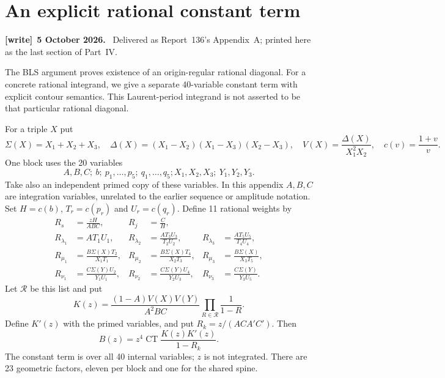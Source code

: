\documentclass[11pt,letterpaper]{article}
\theoremstyle{remark}\newtheorem{remark}[theorem]{Remark}
\numberwithin{equation}{section}
\newenvironment{writenote}[1][]{\par\smallskip\begingroup\small
 \noindent\textbf{[write]}\if\relax\detokenize{#1}\relax\else~\textbf{#1.}\fi\ }%
 {\par\endgroup\smallskip}
\begin{document}
\section{An explicit rational constant term}\label{upo:1243:app:CT}
\begin{writenote}[5 October 2026]
Delivered as Report~136's Appendix~A; printed here as the last section of Part~IV.
\end{writenote}
The BLS argument proves existence of an origin-regular rational diagonal.
For a concrete rational integrand, we give a separate 40-variable constant
term with explicit contour semantics. This Laurent-period integrand is
not asserted to be that particular rational diagonal.

For a triple $X$ put
\[
 \Sigma(X)=X_1+X_2+X_3,\quad
 \Delta(X)=(X_1-X_2)(X_1-X_3)(X_2-X_3),\quad
 V(X)=\frac{\Delta(X)}{X_1^2X_2},\quad c(v)=\frac{1+v}{v}.
\]
One block uses the 20 variables
\[
 A,B,C;\ b;\ p_1,\ldots,p_5;\ q_1,\ldots,q_5; X_1,X_2,X_3;\ Y_1,Y_2,Y_3.
\]
Take also an independent primed copy of these variables. In this appendix
$A,B,C$ are integration variables, unrelated to the earlier sequence or
amplitude notation. Set $H=c(b)$, $T_r=c(p_r)$ and $U_r=c(q_r)$. Define
11 rational weights by
\begin{align*}
 R_s&=\frac{zH}{ABC},& R_j&=\frac C H,\\
 R_{\lambda_1}&=AT_1U_1,&
 R_{\lambda_2}&=\frac{AT_3U_3}{T_2U_2},&
 R_{\lambda_3}&=\frac{AT_5U_5}{T_4U_4},\\
 R_{\mu_1}&=\frac{B\Sigma(X)T_2}{X_1T_1},&
 R_{\mu_2}&=\frac{B\Sigma(X)T_4}{X_2T_3},&
 R_{\mu_3}&=\frac{B\Sigma(X)}{X_3T_5},\\
 R_{\nu_1}&=\frac{C\Sigma(Y)U_2}{Y_1U_1},&
 R_{\nu_2}&=\frac{C\Sigma(Y)U_4}{Y_2U_3},&
 R_{\nu_3}&=\frac{C\Sigma(Y)}{Y_3U_5}.
\end{align*}
Let $\mathcal R$ be this list and put
\[
 K(z)=\frac{(1-A)V(X)V(Y)}{A^2BC}
       \prod_{R\in\mathcal R}\frac1{1-R}.
\]
Define $K'(z)$ with the primed variables, and put $R_k=z/(ACA'C')$.
Then
\begin{equation}\label{upo:1243:eq:CT}
 B(z)=z^4\operatorname{CT}
       \frac{K(z)K'(z)}{1-R_k}.
\end{equation}
The constant term is over all 40 internal variables; $z$ is not
integrated. There are 23 geometric factors, eleven per block and one
for the shared spine.
\end{document}
